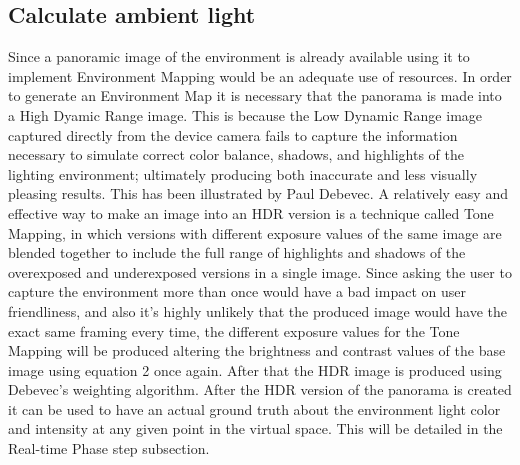 \subsection{Calculate ambient light}
Since a panoramic image of the environment is already available using it to implement Environment Mapping would be an adequate use of resources. In order to generate an Environment Map it is necessary that the panorama is made into a High Dyamic Range image. This is because the Low Dynamic Range image captured directly from the device camera fails to capture the information necessary to simulate correct color balance, shadows, and highlights of the lighting environment; ultimately producing both inaccurate and less visually pleasing results. This has been illustrated by Paul Debevec.\cite{DebevecRSO}\newline 
A relatively easy and effective way to make an image into an HDR version is a technique called Tone Mapping, in which versions with different exposure values of the same image are blended together to include the full range of highlights and shadows of the overexposed and underexposed versions in a single image. Since asking the user to capture the environment more than once would have a bad impact on user friendliness, and also it's highly unlikely that the produced image would have the exact same framing every time, the different exposure values for the Tone Mapping will be produced altering the brightness and contrast values of the base image using equation 2 once again. After that the HDR image is produced using Debevec's weighting algorithm\cite{Debevec}.\newline
After the HDR version of the panorama is created it can be used to have an actual ground truth about the environment light color and intensity at any given point in the virtual space. This will be detailed in the Real-time Phase step subsection.

